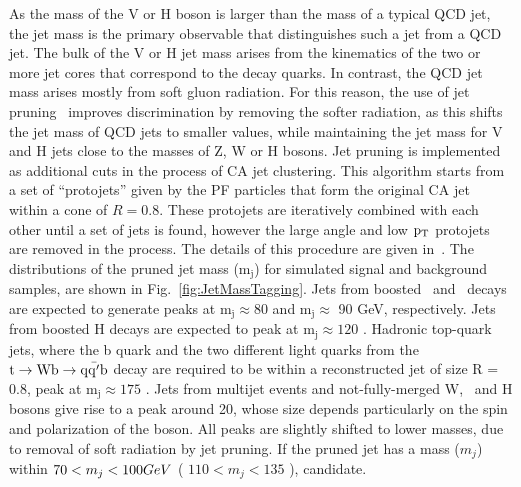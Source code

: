 As the mass of the V or H boson
is larger than the mass of a typical QCD jet, the jet mass is the
primary observable that distinguishes such a jet from a QCD jet.  The
bulk of the V or H jet mass arises from the kinematics of the two or
more jet cores that correspond to the decay quarks.  In contrast, the
QCD jet mass arises mostly from soft gluon radiation.  For this
reason, the use of jet pruning~\cite{jetpruning1,jetpruning2} improves
discrimination by removing the softer radiation, as this shifts the
jet mass of QCD jets to smaller values, while maintaining the jet mass
for V and H jets close to the masses of Z, W or H bosons.  Jet
pruning is implemented as additional cuts in the process of CA jet
clustering.  This algorithm starts from a set of ``protojets'' given
by the PF particles that form the original CA jet within a cone of
$R=0.8$.  These protojets are iteratively combined with each other
until a set of jets is found, however the large angle and low $\mathrm{p_{T}}$
protojets are removed in the process.
The details of this procedure are given in~\cite{JME-13-006}.
The distributions of  the pruned jet mass ($\mathrm{m_j}$) for 
simulated signal and background samples, are shown in
Fig.~\ref{fig:JetMassTagging}.  Jets from boosted \PW\ and
\cPZ\ decays are expected to generate peaks at 
$\mathrm{m_j} \approx 80$ 
and $\mathrm{m_j} \approx$ 90 GeV, respectively. Jets
from boosted H decays are expected to peak at $\mathrm{m_j} \approx
120$ \GeVcc.
Hadronic top-quark jets, where the b quark and the
two different light quarks from the $\rm{t \to Wb \to q\bar{q'}b}$ decay are required
to be within a reconstructed jet of size R = 0.8, 
peak at $\mathrm{m_j} \approx 175$ \GeVcc.   
Jets from multijet events and not-fully-merged
W, \cPZ\ and H bosons give rise to a peak around 20\GeVcc, whose
size depends particularly on the spin and polarization of the boson.
All peaks are slightly shifted to lower masses, due to removal of soft
radiation by jet pruning.
If the pruned jet has a mass ($m_j$)
within 
$70 <m_j<100  GeV $   
(  $110 < m_j <135 $ \GeVcc  ), 
candidate. 


